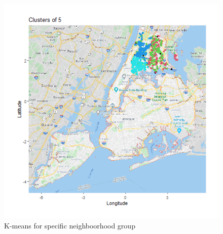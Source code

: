 \documentclass{FR16}
\begin{document}
\begin{figure}[!htb]
\begin{minipage}{0.33\textwidth}
   \end{minipage}
   \begin{minipage}{0.33\textwidth}
     \centering
     \includegraphics[width=1\linewidth]{figures/clust-5.png}
   \end{minipage}
        \caption{K-means for specific neighboorhood group}\label{fig:24}
\end{figure}
\end{document}
